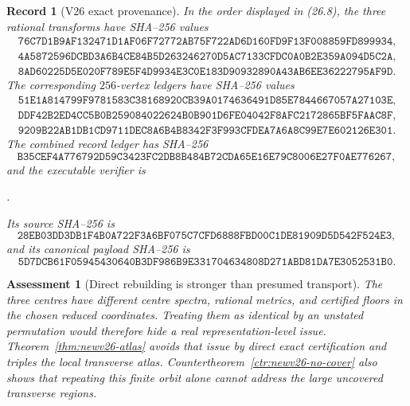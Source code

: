 \documentclass[11pt,oneside]{article}
\newtheorem{assessment}[theorem]{Assessment}
\newtheorem{record}[theorem]{Record}
\theoremstyle{definition}
\theoremstyle{remark}
\begin{document}
\begin{record}[V26 exact provenance]
\label{rec:newv26-provenance}
In the order displayed in (26.8), the three rational transforms have
SHA--256 values
\[
\begin{gathered}
\texttt{76C7D1B9AF132471D1AF06F72772AB75F722AD6D160FD9F13F008859FD899934},\\
\texttt{4A5872596DCBD3A6B4CE84B5D263246270D5AC7133CFDC0A0B2E359A094D5C2A},\\
\texttt{8AD60225D5E020F789E5F4D9934E3C0E183D90932890A43AB6EE36222795AF9D}.
\end{gathered}                                          \tag{26.10}
\]
The corresponding \(256\)-vertex ledgers have SHA--256 values
\[
\begin{gathered}
\texttt{51E1A814799F9781583C38168920CB39A0174636491D85E7844667057A27103E},\\
\texttt{DDF42B2ED4CC5B0B259084022624B0B901D6FE04042F8AFC2172865BF5FAAC8F},\\
\texttt{9209B22AB1DB1CD9711DEC8A6B4B8342F3F993CFDEA7A6A8C99E7E602126E301}.
\end{gathered}                                          \tag{26.11}
\]
The combined record ledger has SHA--256
\[
\texttt{B35CEF4A776792D59C3423FC2DB8B484B72CDA65E16E79C8006E27F0AE776267},
                                                               \tag{26.12}
\]
and the executable verifier is
\begin{center}
\footnotesize
{}.
\end{center}
Its source SHA--256 is
\[
\texttt{28EB03DD3DB1F4B0A722F3A6BF075C7CFD6888FBD00C1DE81909D5D542F524E3},
                                                               \tag{26.13}
\]
and its canonical payload SHA--256 is
\[
\texttt{5D7DCB61F05945430640B3DF986B9E331704634808D271ABD81DA7E3052531B0}.
                                                               \tag{26.14}
\]
\end{record}

\begin{assessment}[Direct rebuilding is stronger than presumed transport]
\label{ass:newv26}
The three centres have different centre spectra, rational metrics,
and certified floors in the chosen reduced coordinates.  Treating
them as identical by an unstated permutation would therefore hide a
real representation-level issue.  Theorem~\ref{thm:newv26-atlas}
avoids that issue by direct exact certification and triples the
local transverse atlas.  Countertheorem~\ref{ctr:newv26-no-cover}
also shows that repeating this finite orbit alone cannot address the
large uncovered transverse regions.
\end{assessment}
\end{document}
